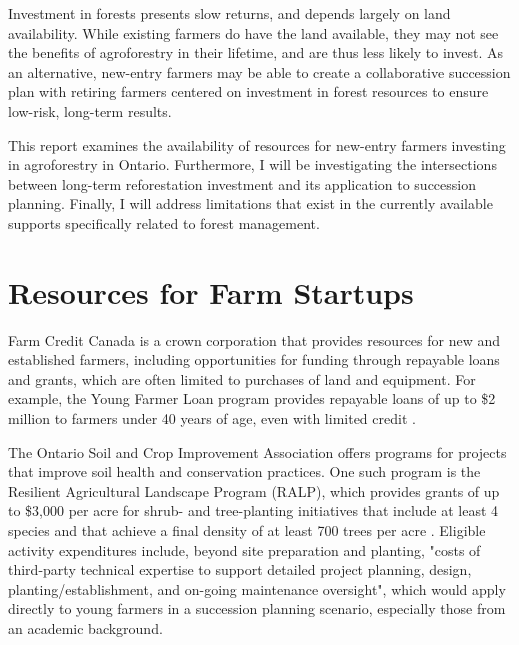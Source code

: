 \documentclass{report}
\begin{document}

\hspace{24pt}Investment in forests presents slow returns, and depends largely on land availability. While existing farmers do have the land available, they may not see the benefits of agroforestry in their lifetime, and are thus less likely to invest. As an alternative, new-entry farmers may be able to create a collaborative succession plan with retiring farmers centered on investment in forest resources to ensure low-risk, long-term results.

\hspace{24pt}This report examines the availability of resources for new-entry farmers investing in agroforestry in Ontario. Furthermore, I will be investigating the intersections between long-term reforestation investment and its application to succession planning. Finally, I will address limitations that exist in the currently available supports specifically related to forest management.

\clearpage

\section{Resources for Farm Startups}

\hspace{24pt}Farm Credit Canada is a crown corporation that provides resources for new and established farmers, including opportunities for funding through repayable loans and grants, which are often limited to purchases of land and equipment. For example, the Young Farmer Loan program provides repayable loans of up to \$2 million to farmers under 40 years of age, even with limited credit \parencite{fcc_youngfarmers}.

\hspace{24pt}The Ontario Soil and Crop Improvement Association offers programs for projects that improve soil health and conservation practices. One such program is the Resilient Agricultural Landscape Program (RALP), which provides grants of up to \$3,000 per acre for shrub- and tree-planting initiatives that include at least 4 species and that achieve a final density of at least 700 trees per acre \parencite{oscp_ralp}. Eligible activity expenditures include, beyond site preparation and planting, "costs of third-party technical expertise to support detailed project planning, design, planting/establishment, and on-going maintenance oversight", which would apply directly to young farmers in a succession planning scenario, especially those from an academic background.
\end{document}
